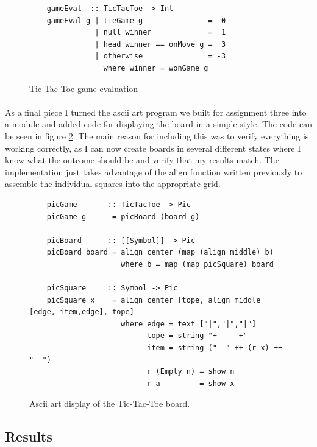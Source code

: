 \documentclass[10pt]{article}
\begin{document}
    \begin{figure}[ht]
        \centering
        \begin{verbatim}
    gameEval  :: TicTacToe -> Int
    gameEval g | tieGame g               =  0
               | null winner             =  1
               | head winner == onMove g =  3
               | otherwise               = -3
                 where winner = wonGame g        \end{verbatim}
        \caption{Tic-Tac-Toe game evaluation} \label{ttteval}
    \end{figure}

    \paragraph{} As a final piece I turned the ascii art program we built for assignment
    three into a module and added code for displaying the board in a simple style.  The 
    code can be seen in figure \ref{tttascii}.  The main reason for including this was
    to verify everything is working correctly, as I can now create boards in several 
    different states where I know what the outcome should be and verify that my results 
    match.  The implementation just takes advantage of the align function written 
    previously to assemble the individual squares into the appropriate grid.

    \begin{figure}[ht]
        \centering
        \begin{verbatim}
    picGame       :: TicTacToe -> Pic
    picGame g      = picBoard (board g)       

    picBoard      :: [[Symbol]] -> Pic
    picBoard board = align center (map (align middle) b)
                     where b = map (map picSquare) board

    picSquare     :: Symbol -> Pic
    picSquare x    = align center [tope, align middle [edge, item,edge], tope]
                     where edge = text ["|","|","|"]
                           tope = string "+-----+"
                           item = string ("  " ++ (r x) ++ "  ")
                           r (Empty n) = show n
                           r a         = show x \end{verbatim}
        \caption{Ascii art display of the Tic-Tac-Toe board.} \label{tttascii}
    \end{figure}
 
\subsection{Results}
\end{document}
